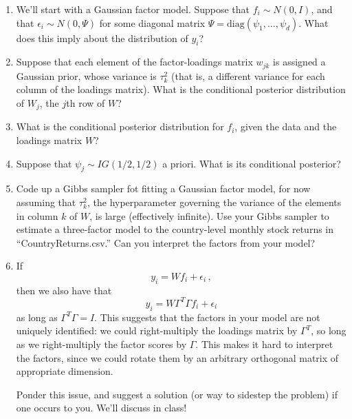 \documentclass{mynotes}
\begin{document}
\begin{enumerate}

\item  We'll start with a Gaussian factor model. Suppose that $f_i \sim N(0, I)$, and that $\epsilon_i \sim N(0, \Psi)$ for some diagonal matrix $\Psi = \mbox{diag}(\psi_1, \ldots, \psi_d)$.  What does this imply about the distribution of $y_i$?

\item Suppose that each element of the factor-loadings matrix $w_{jk}$ is assigned a Gaussian prior, whose variance is $\tau^2_k$ (that is, a different variance for each column of the loadings matrix).  What is the conditional posterior distribution of $W_j$, the $j$th row of $W$?

\item What is the conditional posterior distribution for $f_i$, given the data and the loadings matrix $W$?

\item Suppose that $\psi_j \sim IG(1/2, 1/2)$ a priori.  What is its conditional posterior?

\item Code up a Gibbs sampler fot fitting a Gaussian factor model, for now assuming that $\tau^2_k$, the hyperparameter governing the variance of the elements in column $k$ of $W$, is large (effectively infinite).  Use your Gibbs sampler to estimate a three-factor model to the country-level monthly stock returns in ``CountryReturns.csv.''  Can you interpret the factors from your model?

\item If
$$
y_i =	 W f_i + \epsilon_i \, ,
$$
then we also have that
$$
y_i = W \Gamma^T \Gamma f_i + \epsilon_i
$$
as long as $\Gamma^T \Gamma = I$.  This suggests that the factors in your model are not uniquely identified: we could right-multiply the loadings matrix by $\Gamma^T$, so long as we right-multiply the factor scores by $\Gamma$.  This makes it hard to interpret the factors, since we could rotate them by an arbitrary orthogonal matrix of appropriate dimension.

Ponder this issue, and suggest a solution (or way to sidestep the problem) if one occurs to you.  We'll discuss in class!

\end{enumerate}
\end{document}
